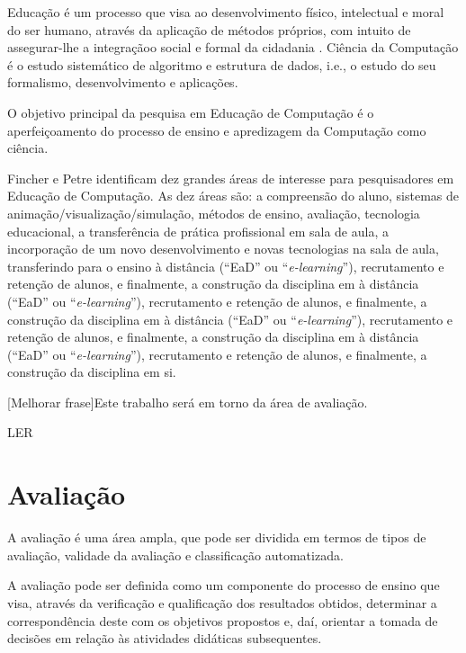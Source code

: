 \documentclass[
	12pt,				%
	openright,			%
	oneside,
	a4paper,			%
	english,			%
	french,				%
	spanish,			%
	brazil,				%
	]{abntex2}
\begin{document}
Educação é um processo que visa ao desenvolvimento físico, intelectual e moral do ser humano, através da aplicação de métodos próprios, com intuito de assegurar-lhe a integraçãoo social e formal da cidadania \cite{weiszflog1999michaelis}. Ciência da Computação é o estudo sistemático de algoritmo e estrutura de dados, i.e., o estudo do seu formalismo, desenvolvimento e aplicações. \cite{gibbs1986model}

O objetivo principal da pesquisa em Educação de Computação é o aperfeiçoamento do processo de ensino e apredizagem da Computação como ciência. \cite{holmboe2001research}

Fincher e Petre \cite{fincher2005mapping} identificam dez grandes áreas de interesse para pesquisadores em Educação de Computação. As dez áreas são: a compreensão do aluno, sistemas de animação/visualização/simulação, métodos de ensino, avaliação, tecnologia educacional, a transferência de prática profissional em sala de aula, a incorporação de um novo desenvolvimento e novas tecnologias na sala de aula, transferindo para o ensino à distância (“EaD” ou “\textit{e-learning}”), recrutamento e retenção de alunos, e finalmente, a construção da disciplina em à distância (“EaD” ou “\textit{e-learning}”), recrutamento e retenção de alunos, e finalmente, a construção da disciplina em à distância (“EaD” ou “\textit{e-learning}”), recrutamento e retenção de alunos, e finalmente, a construção da disciplina em à distância (“EaD” ou “\textit{e-learning}”), recrutamento e retenção de alunos, e finalmente, a construção da disciplina em si. 

{\color{red}[Melhorar frase]Este trabalho será em torno da área de avaliação.}

{\color{red}LER}
\cite{da2014metodos}
\cite{perrenoud1999avaliaccao}

\section{Avaliação}
\label{sec:AVA}
A avaliação é uma área ampla, que pode ser dividida em termos de tipos de avaliação, validade da avaliação e classificação automatizada. \cite{fincher2005mapping}

A avaliação pode ser definida como um componente do processo de ensino que visa, através da verificação e qualificação dos resultados obtidos, determinar a correspondência  deste com os objetivos propostos e, daí, orientar a tomada de decisões em relação às atividades didáticas subsequentes. \cite{libaneo1994didatica}
\end{document}
